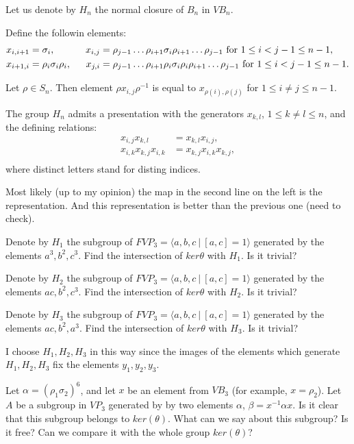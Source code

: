 \documentclass{article}
\begin{document}
Let us denote by $H_n$ the normal closure of $B_n$ in $VB_n$.

Define the followin elements: 
\begin{align*}
x_{i,i+1}&=\sigma_i, ~~& x_{i,j}&=\rho_{j-1}\ldots \rho_{i+1}\sigma_i\rho_{i+1}\ldots \rho_{j-1} ~{\rm for}~ 1\le i<j-1\le n-1,\\
x_{i+1,i}&=\rho_i\sigma_i\rho_i, ~~& x_{j,i}&=\rho_{j-1}\ldots \rho_{i+1}\rho_i\sigma_i\rho_i\rho_{i+1}\ldots \rho_{j-1} ~{\rm for}~ 1\le i<j-1\le n-1.\\
\end{align*}


\begin{lemma}
	Let $\rho \in S_n$. Then element $\rho x_{i,j}\rho^{-1}$ is equal to $x_{\rho(i),\rho(j)}$ for $1\le i\ne j\le n-1$.
\end{lemma}


\begin{lemma}
	The group $H_n$ admits a presentation with the generators $x_{k,l}$, $1\le k\ne l\le n$, and the defining relations:
	\begin{align*}
	x_{i,j}x_{k,l}&=x_{k,l}x_{i,j},\\
	x_{i,k}x_{k,j}x_{i,k}&=x_{k,j}x_{i,k}x_{k,j},\\
	\end{align*}
	where distinct letters stand for disting indices.
\end{lemma}

Most likely (up to my opinion) the map in the second line on the left is the representation. And this representation is better than the previous one (need to check).

Denote by $H_1$ the subgroup of $FVP_3=\langle a,b,c~|~[a,c]=1\rangle$ generated by the elements $a^3,b^2,c^3$. Find the intersection of $ker{\theta}$ with $H_1$. Is it trivial?

Denote by $H_2$ the subgroup of $FVP_3=\langle a,b,c~|~[a,c]=1\rangle$ generated by the elements $ac,b^2,c^3$. Find the intersection of $ker{\theta}$ with $H_2$. Is it trivial?

Denote by $H_3$ the subgroup of $FVP_3=\langle a,b,c~|~[a,c]=1\rangle$ generated by the elements $ac,b^2,a^3$. Find the intersection of $ker{\theta}$ with $H_3$. Is it trivial?

I choose $H_1,H_2,H_3$ in this way since the images of the elements which generate $H_1,H_2,H_3$ fix the elements $y_1,y_2,y_3$. 

Let $\alpha=(\rho_1\sigma_2)^6$, and let $x$ be an element from $VB_3$ (for example, $x=\rho_2$). Let $A$ be a subgroup in $VP_3$ generated by by two elements $\alpha$, $\beta=x^{-1}\alpha x$. Is it clear that this subgroup belongs to $ker(\theta)$. What can we say about this subgroup? Is it free? Can we compare it with the whole group $ker(\theta)$?
\end{document}
